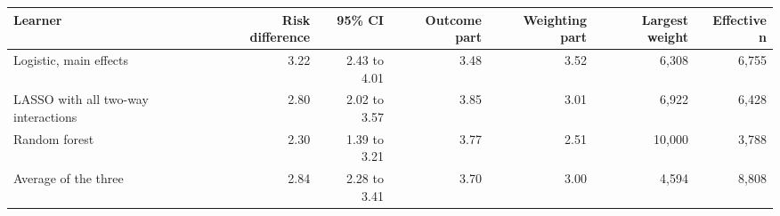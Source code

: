 {\small
\begin{tabular}{lrrrrrr}
\toprule
Learner & Risk difference & 95\% CI & Outcome part & Weighting part & Largest weight & Effective n \\
\midrule
Logistic, main effects & 3.22 & 2.43 to 4.01 & 3.48 & 3.52 & 6,308 & 6,755 \\
LASSO with all two-way interactions & 2.80 & 2.02 to 3.57 & 3.85 & 3.01 & 6,922 & 6,428 \\
Random forest & 2.30 & 1.39 to 3.21 & 3.77 & 2.51 & 10,000 & 3,788 \\
Average of the three & 2.84 & 2.28 to 3.41 & 3.70 & 3.00 & 4,594 & 8,808 \\
\bottomrule
\end{tabular}
}
